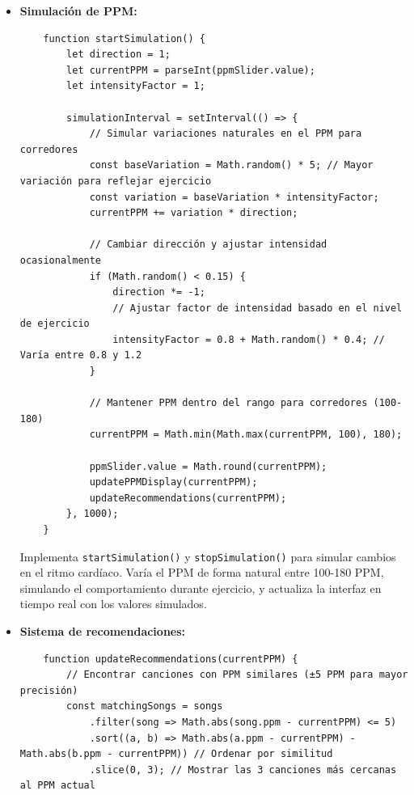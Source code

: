 \documentclass[a4paper,12pt]{article}
\begin{document}
\begin{itemize}
    \item \textbf{Simulación de PPM:}
    \begin{verbatim}
    function startSimulation() {
        let direction = 1;
        let currentPPM = parseInt(ppmSlider.value);
        let intensityFactor = 1;
        
        simulationInterval = setInterval(() => {
            // Simular variaciones naturales en el PPM para corredores
            const baseVariation = Math.random() * 5; // Mayor variación para reflejar ejercicio
            const variation = baseVariation * intensityFactor;
            currentPPM += variation * direction;
            
            // Cambiar dirección y ajustar intensidad ocasionalmente
            if (Math.random() < 0.15) {
                direction *= -1;
                // Ajustar factor de intensidad basado en el nivel de ejercicio
                intensityFactor = 0.8 + Math.random() * 0.4; // Varía entre 0.8 y 1.2
            }
            
            // Mantener PPM dentro del rango para corredores (100-180)
            currentPPM = Math.min(Math.max(currentPPM, 100), 180);
            
            ppmSlider.value = Math.round(currentPPM);
            updatePPMDisplay(currentPPM);
            updateRecommendations(currentPPM);
        }, 1000);
    }
    \end{verbatim}
    Implementa \texttt{startSimulation()} y \texttt{stopSimulation()} para simular cambios en el ritmo cardíaco. Varía el PPM de forma natural entre 100-180 PPM, simulando el comportamiento durante ejercicio, y actualiza la interfaz en tiempo real con los valores simulados.

    \item \textbf{Sistema de recomendaciones:}
    \begin{verbatim}
    function updateRecommendations(currentPPM) {
        // Encontrar canciones con PPM similares (±5 PPM para mayor precisión)
        const matchingSongs = songs
            .filter(song => Math.abs(song.ppm - currentPPM) <= 5)
            .sort((a, b) => Math.abs(a.ppm - currentPPM) - Math.abs(b.ppm - currentPPM)) // Ordenar por similitud
            .slice(0, 3); // Mostrar las 3 canciones más cercanas al PPM actual


\end{verbatim}
\end{itemize}
\end{document}

